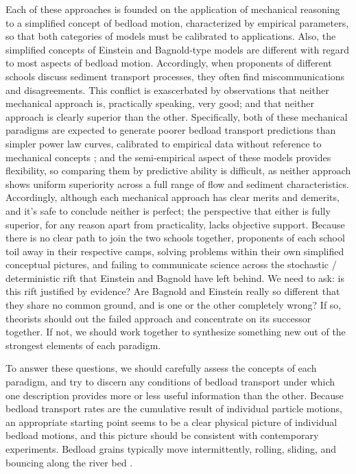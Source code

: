 \documentclass{article}
\begin{document}
Each of these approaches is founded on the application of mechanical reasoning to a simplified concept of bedload motion, characterized by empirical parameters, so that both categories of models must be calibrated to applications. 
Also, the simplified concepts of Einstein and Bagnold-type models are different with regard to most aspects of bedload motion.
Accordingly, when proponents of different schools discuss sediment transport processes, they often find miscommunications and disagreements. 
This conflict is exascerbated by observations that neither mechanical approach is, practically speaking, very good; and that neither approach is clearly superior than the other. 
Specifically, both of these mechanical paradigms are expected to generate poorer bedload transport predictions than simpler power law curves, calibrated to empirical data without reference to mechanical concepts \citep{Barry2004}; and the semi-empirical aspect of these models provides flexibility, so comparing them by predictive ability is difficult, as neither approach shows uniform superiority across a full range of flow and sediment characteristics. 
Accordingly, although each mechanical approach has clear merits and demerits, and it's safe to conclude neither is perfect; the perspective that either is fully superior, for any reason apart from practicality, lacks objective support. 
Because there is no clear path to join the two schools together, proponents of each school toil away in their respective camps, solving problems within their own simplified conceptual pictures, and failing to communicate science across the stochastic / deterministic rift that Einstein and Bagnold have left behind. 
We need to ask: is this rift justified by evidence? Are Bagnold and Einstein really so different that they share no common ground, and is one or the other completely wrong? If so, theorists should out the failed approach and concentrate on its successor together. If not, we should work together to synthesize something new out of the strongest elements of each paradigm. 

To answer these questions, we should carefully assess the concepts of each paradigm, and try to discern any conditions of bedload transport under which one description provides more or less useful information than the other. 
Because bedload transport rates are the cumulative result of individual particle motions, an appropriate starting point seems to be a clear physical picture of individual bedload motions, and this picture should be consistent with contemporary experiments. 
Bedload grains typically move intermittently, rolling, sliding, and bouncing along the river bed \citep{Einstein1950, Bagnold1973}.
\end{document}
